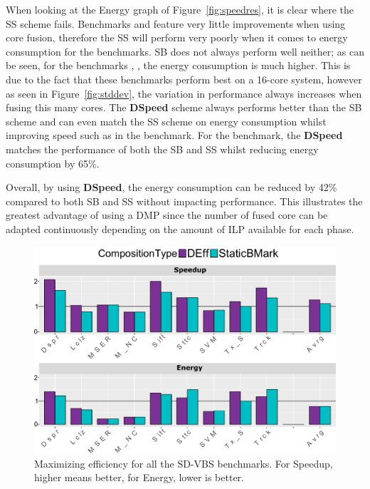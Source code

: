 When looking at the Energy graph of Figure~\ref{fig:speedres}, it is clear where the SS scheme fails.
Benchmarks  and  feature very little improvements when using core fusion, therefore the SS will perform very poorly when it comes to energy consumption for the benchmarks.
SB does not always perform well neither; as can be seen, for the benchmarks , ,  the energy consumption is much higher.
This is due to the fact that these benchmarks perform best on a 16-core system, however as seen in Figure~\ref{fig:stddev}, the variation in performance always increases when fusing this many cores.
The \textbf{DSpeed} scheme always performs better than the SB scheme and can even match the SS scheme on energy consumption whilst improving speed such as in the  benchmark.
For the  benchmark, the \textbf{DSpeed} matches the performance of both the SB and SS whilst reducing energy consumption by 65\%.

Overall, by using \textbf{DSpeed}, the energy consumption can be reduced by 42\% compared to both SB and SS without impacting performance.
This illustrates the greatest advantage of using a DMP since the number of fused core can be adapted continuously depending on the amount of ILP available for each phase.


\begin{figure}[t]
    \centering
    \includegraphics[width=1\textwidth]{cases-paper/graphics/results/edd_bars2.pdf}
    \caption{Maximizing efficiency for all the SD-VBS benchmarks. For Speedup, higher means better, for Energy, lower is better.}
    \label{fig:effres}
	\vspace{1em}
\end{figure}
